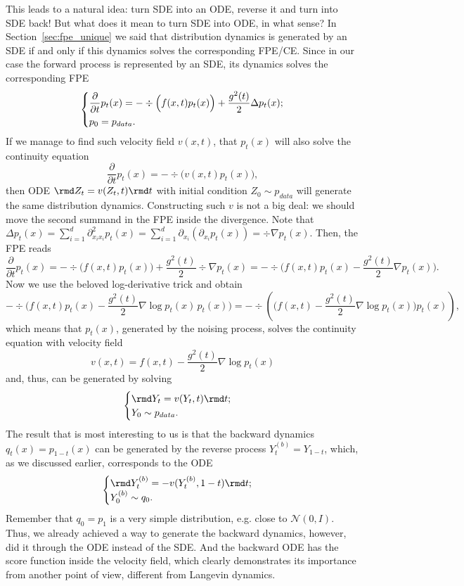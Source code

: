 This leads to a natural idea: turn SDE into an ODE, reverse it and turn into SDE back! But what does it mean to turn SDE into ODE, in what sense? In Section~\ref{sec:fpe_unique} we said that distribution dynamics is generated by an SDE if and only if this dynamics solves the corresponding FPE/CE. Since in our case the forward process is represented by an SDE, its dynamics solves the corresponding FPE
\[
    \begin{dcases}
        \frac{\partial}{\partial t} p_t(x) = -\div\Big(f(x, t)p_t(x)\Big) + \frac{g^2(t)}{2} \Delta p_t(x);\\
        p_0 = p_{data}.
    \end{dcases}
\]
If we manage to find such velocity field $v(x, t)$, that $p_t(x)$ will also solve the continuity equation 
\[
    \frac{\partial}{\partial t} p_t(x) = -\div \Big(v(x, t)p_t(x)\Big),
\]
then ODE $\rmd Z_t = v(Z_t, t)\rmd t$ with initial condition $Z_0 \sim p_{data}$ will generate the same distribution dynamics. Constructing such $v$ is not a big deal: we should move the second summand in the FPE inside the divergence. Note that $\Delta p_t(x) = \sum_{i = 1}^{d}\partial^2_{x_i x_i} p_t(x) = \sum_{i = 1}^{d} \partial_{x_i}(\partial_{x_i} p_t(x)) = \div \nabla p_t(x)$. Then, the FPE reads
\[
    \frac{\partial}{\partial t} p_t(x) = -\div\Big(f(x, t)p_t(x)\Big) + \frac{g^2(t)}{2} \div \nabla p_t(x) = -\div\Big(f(x, t)p_t(x) - \frac{g^2(t)}{2} \nabla p_t(x) \Big).
\]
Now we use the beloved log-derivative trick and obtain
\[
    -\div\Big(f(x, t)p_t(x) - \frac{g^2(t)}{2}\nabla \log p_t(x) \, p_t(x)\Big) = -\div\left(\Big(f(x, t) - \frac{g^2(t)}{2} \nabla \log p_t(x)\Big)p_t(x)\right),
\]
which means that $p_t(x)$, generated by the noising process, solves the continuity equation with velocity field
\[
    v(x, t) = f(x, t) - \frac{g^2(t)}{2} \nabla \log p_t(x)
\]
and, thus, can be generated by solving
\[
    \begin{cases}
        \rmd Y_t = v(Y_t, t) \rmd t;\\
        Y_0 \sim p_{data}.
    \end{cases}
\]
The result that is most interesting to us is that the backward dynamics $q_t(x) = p_{1 - t}(x)$ can be generated by the reverse process $Y_t^{(b)} = Y_{1 - t}$, which, as we discussed earlier, corresponds to the ODE
\[
    \begin{cases}
        \rmd Y_t^{(b)} = -v(Y_t^{(b)}, 1 - t)\rmd t;\\
        Y_0^{(b)} \sim q_0.
    \end{cases}
\]
Remember that $q_0 = p_1$ is a very simple distribution, e.g. close to $\mathcal{N}(0, I)$. Thus, we already achieved a way to generate the backward dynamics, however, did it through the ODE instead of the SDE. And the backward ODE has the score function inside the velocity field, which clearly demonstrates its importance from another point of view, different from Langevin dynamics. 

